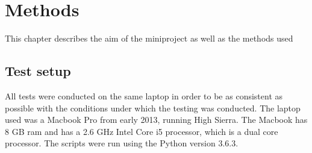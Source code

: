 \chapter{Methods}
This chapter describes the aim of the miniproject as well as the methods used 
\section{Test setup}
All tests were conducted on the same laptop in order to be as consistent as possible with the conditions under which the testing was conducted. The laptop used was a Macbook Pro from early 2013, running High Sierra. The Macbook has 8 GB ram and has a 2.6 GHz Intel Core i5 processor, which is a dual core processor. The scripts were run using the Python version 3.6.3. 